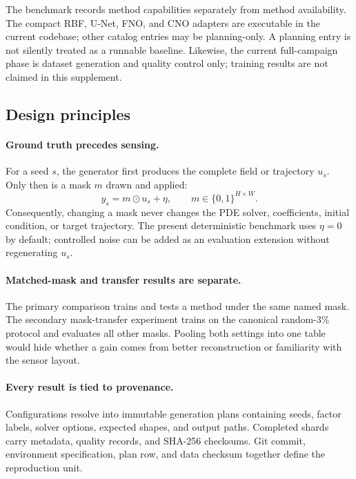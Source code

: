 \documentclass[10pt]{article}
\begin{document}
The benchmark records method capabilities separately from method availability.
The compact RBF, U-Net, FNO, and CNO adapters are executable in the current
codebase; other catalog entries may be planning-only.  A planning entry is not
silently treated as a runnable baseline.  Likewise, the current full-campaign
phase is dataset generation and quality control only; training results are not
claimed in this supplement.

\subsection{Design principles}

\paragraph{Ground truth precedes sensing.}
For a seed $s$, the generator first produces the complete field or trajectory
$u_s$.  Only then is a mask $m$ drawn and applied:
\begin{equation}
  y_s = m\odot u_s + \eta,
  \qquad m\in\{0,1\}^{H\times W}.
\end{equation}
Consequently, changing a mask never changes the PDE solver, coefficients,
initial condition, or target trajectory.  The present deterministic benchmark
uses $\eta=0$ by default; controlled noise can be added as an evaluation
extension without regenerating $u_s$.

\paragraph{Matched-mask and transfer results are separate.}
The primary comparison trains and tests a method under the same named mask.
The secondary mask-transfer experiment trains on the canonical random-3\%
protocol and evaluates all other masks.  Pooling both settings into one table
would hide whether a gain comes from better reconstruction or familiarity with
the sensor layout.

\paragraph{Every result is tied to provenance.}
Configurations resolve into immutable generation plans containing seeds,
factor labels, solver options, expected shapes, and output paths.  Completed
shards carry metadata, quality records, and SHA-256 checksums.  Git commit,
environment specification, plan row, and data checksum together define the
reproduction unit.
\end{document}
